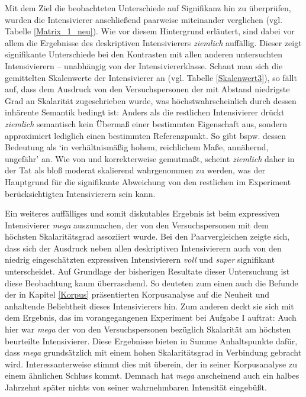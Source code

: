 Mit dem Ziel die beobachteten Unterschiede auf Signifikanz hin zu überprüfen, wurden die Intensivierer anschließend paarweise miteinander verglichen (vgl. {Tabelle \ref{Matrix_1_neu}}). Wie vor diesem Hintergrund erläutert, sind dabei vor allem die Ergebnisse des deskriptiven Intensivierers \textit{ziemlich} auffällig. Dieser zeigt signifikante Unterschiede bei den Kontrasten mit allen anderen untersuchten Intensivierern -- unabhängig von der Intensiviererklasse. Schaut man sich die gemittelten Skalenwerte der Intensivierer an (vgl. {Tabelle \ref{Skalenwert3}}), so fällt auf, dass dem Ausdruck von den Versuchspersonen der mit Abstand niedrigste Grad an Skalarität zugeschrieben wurde, was höchstwahrscheinlich durch dessen inhärente Semantik bedingt ist: Anders als die restlichen Intensivierer drückt \textit{ziemlich} semantisch kein Übermaß einer bestimmten Eigenschaft aus, sondern approximiert lediglich einen bestimmten Referenzpunkt. So gibt bspw. \citet[1610]{Pfeifer.1995} dessen Bedeutung als `in verhältnismäßig hohem, reichlichem Maße, annähernd, ungefähr' an. Wie von {\citet[87]{Biedermann.1969}} und \citet[408]{Breindl.2007} korrekterweise gemutmaßt, scheint \textit{ziemlich} daher in der Tat als bloß moderat skalierend wahrgenommen zu werden, was der Hauptgrund für die signifikante Abweichung von den restlichen im Experiment berücksichtigten Intensivierern sein kann.


Ein weiteres auffälliges und somit diskutables Ergebnis ist beim expressiven Intensivierer \textit{mega} auszumachen, der von den Versuchspersonen mit dem höchsten Skalaritätsgrad assoziiert wurde. Bei den Paarvergleichen zeigte sich, dass sich der Ausdruck neben allen deskriptiven Intensivierern auch von den niedrig eingeschätzten expressiven Intensivierern \textit{voll} und \textit{super} signifikant unterscheidet. Auf Grundlage der bisherigen Resultate dieser Untersuchung ist diese Beobachtung kaum überraschend. So deuteten zum einen auch die Befunde der in {Kapitel \ref{Korpus}} präsentierten Korpusanalyse auf die Neuheit und anhaltende Beliebtheit dieses Intensivierers hin. Zum anderen deckt sie sich mit dem Ergebnis, das im vorangegangenen Experiment bei {Aufgabe I} auftrat: Auch hier war \textit{mega} der von den Versuchspersonen bezüglich Skalarität am höchsten beurteilte Intensivierer. Diese Ergebnisse bieten in Summe Anhaltspunkte dafür, dass \textit{mega} grundsätzlich mit einem hohen Skalaritätsgrad in Verbindung gebracht wird. Interessanterweise stimmt dies mit {\citet[]{Calpestrati.2017}} überein, der in seiner Korpusanalyse zu einem ähnlichen Schluss kommt. Demnach hat \textit{mega} anscheinend auch ein halbes Jahrzehnt später nichts von seiner wahrnehmbaren Intensität {eingebüßt}.


